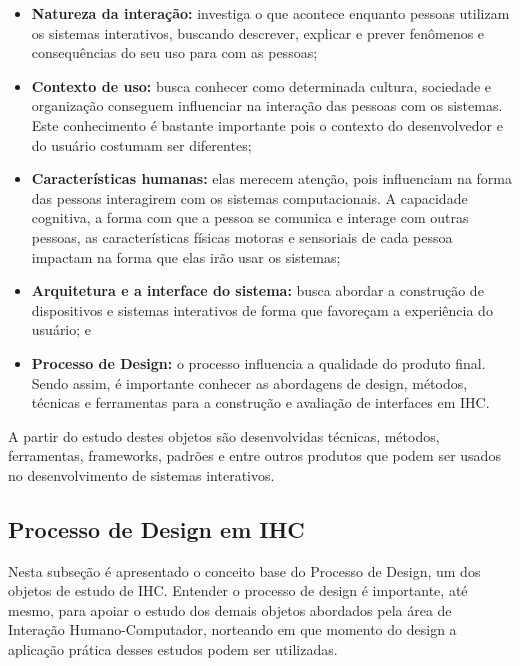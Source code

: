 \begin{itemize}
    \item \textbf{Natureza da interação:} investiga o que acontece enquanto pessoas utilizam os sistemas interativos, buscando descrever, explicar e prever fenômenos e consequências do seu uso para com as pessoas;

    \item \textbf{Contexto de uso:} busca conhecer como determinada cultura, sociedade e organização conseguem influenciar na interação das pessoas com os sistemas. Este conhecimento é bastante importante pois o contexto do desenvolvedor e do usuário costumam ser diferentes;

    \item \textbf{Características humanas:} elas merecem atenção, pois influenciam na forma das pessoas interagirem com os sistemas computacionais. A capacidade cognitiva, a forma com que a pessoa se comunica e interage com outras pessoas, as características físicas motoras e sensoriais de cada pessoa impactam na forma que elas irão usar os sistemas;

    \item \textbf{Arquitetura e a interface do sistema:} busca abordar a construção de dispositivos e sistemas interativos de forma que favoreçam a experiência do usuário; e

    \item \textbf{Processo de Design:} o processo influencia a qualidade do produto final. Sendo assim, é importante conhecer as abordagens de design, métodos, técnicas e ferramentas para a construção e avaliação de interfaces em IHC. 
\end{itemize}

A partir do estudo destes objetos são desenvolvidas técnicas, métodos, ferramentas, frameworks, padrões e entre outros produtos que podem ser usados no desenvolvimento de sistemas interativos.

\subsection{Processo de Design em IHC}
\label{sub:process_ihc}
Nesta subseção é apresentado o conceito base do Processo de Design, um dos objetos de estudo de IHC. Entender o processo de design é importante, até mesmo, para apoiar o estudo dos demais objetos abordados pela área de Interação Humano-Computador, norteando em que momento do design a aplicação prática desses estudos podem ser utilizadas.

